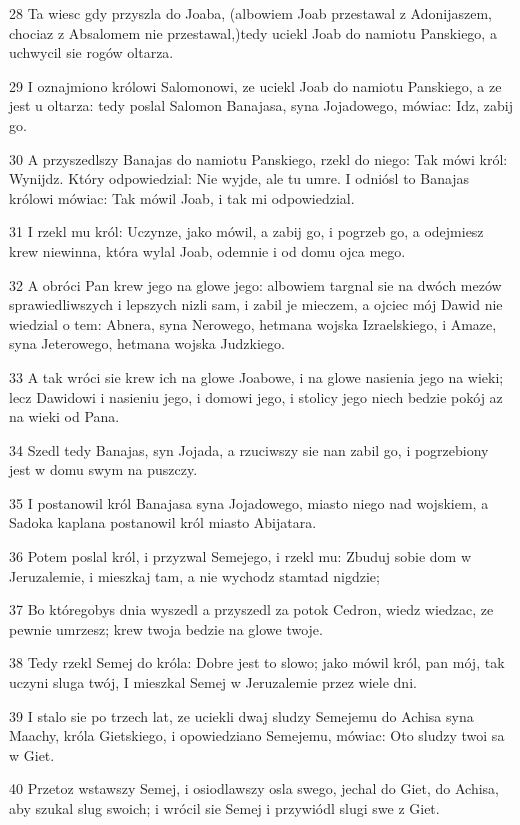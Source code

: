 \par 28 Ta wiesc gdy przyszla do Joaba, (albowiem Joab przestawal z Adonijaszem, chociaz z Absalomem nie przestawal,)tedy uciekl Joab do namiotu Panskiego, a uchwycil sie rogów oltarza.
\par 29 I oznajmiono królowi Salomonowi, ze uciekl Joab do namiotu Panskiego, a ze jest u oltarza: tedy poslal Salomon Banajasa, syna Jojadowego, mówiac: Idz, zabij go.
\par 30 A przyszedlszy Banajas do namiotu Panskiego, rzekl do niego: Tak mówi król: Wynijdz. Który odpowiedzial: Nie wyjde, ale tu umre. I odniósl to Banajas królowi mówiac: Tak mówil Joab, i tak mi odpowiedzial.
\par 31 I rzekl mu król: Uczynze, jako mówil, a zabij go, i pogrzeb go, a odejmiesz krew niewinna, która wylal Joab, odemnie i od domu ojca mego.
\par 32 A obróci Pan krew jego na glowe jego: albowiem targnal sie na dwóch mezów sprawiedliwszych i lepszych nizli sam, i zabil je mieczem, a ojciec mój Dawid nie wiedzial o tem: Abnera, syna Nerowego, hetmana wojska Izraelskiego, i Amaze, syna Jeterowego, hetmana wojska Judzkiego.
\par 33 A tak wróci sie krew ich na glowe Joabowe, i na glowe nasienia jego na wieki; lecz Dawidowi i nasieniu jego, i domowi jego, i stolicy jego niech bedzie pokój az na wieki od Pana.
\par 34 Szedl tedy Banajas, syn Jojada, a rzuciwszy sie nan zabil go, i pogrzebiony jest w domu swym na puszczy.
\par 35 I postanowil król Banajasa syna Jojadowego, miasto niego nad wojskiem, a Sadoka kaplana postanowil król miasto Abijatara.
\par 36 Potem poslal król, i przyzwal Semejego, i rzekl mu: Zbuduj sobie dom w Jeruzalemie, i mieszkaj tam, a nie wychodz stamtad nigdzie;
\par 37 Bo któregobys dnia wyszedl a przyszedl za potok Cedron, wiedz wiedzac, ze pewnie umrzesz; krew twoja bedzie na glowe twoje.
\par 38 Tedy rzekl Semej do króla: Dobre jest to slowo; jako mówil król, pan mój, tak uczyni sluga twój, I mieszkal Semej w Jeruzalemie przez wiele dni.
\par 39 I stalo sie po trzech lat, ze uciekli dwaj sludzy Semejemu do Achisa syna Maachy, króla Gietskiego, i opowiedziano Semejemu, mówiac: Oto sludzy twoi sa w Giet.
\par 40 Przetoz wstawszy Semej, i osiodlawszy osla swego, jechal do Giet, do Achisa, aby szukal slug swoich; i wrócil sie Semej i przywiódl slugi swe z Giet.
